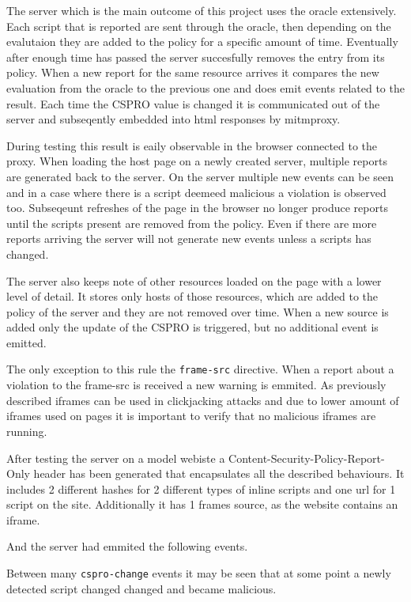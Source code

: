 \begin{description}
The server which is the main outcome of this project uses the oracle extensively.
Each script that is reported are sent through the oracle, then depending on the evalutaion they are added to the policy for a specific amount of time.
Eventually after enough time has passed the server succesfully removes the entry from its policy.
When a new report for the same resource arrives it compares the new evaluation from the oracle to the previous one and does emit events related to the result.
Each time the CSPRO value is changed it is communicated out of the server and subseqently embedded into html responses by mitmproxy.

During testing this result is eaily observable in the browser connected to the proxy.
When loading the host page on a newly created server, multiple reports are generated back to the server.
On the server multiple new events can be seen and in a case where there is a script deemeed malicious a violation is observed too.
Subseqeunt refreshes of the page in the browser no longer produce reports until the scripts present are removed from the policy.
Even if there are more reports arriving the server will not generate new events unless a scripts has changed.

The server also keeps note of other resources loaded on the page with a lower level of detail.
It stores only hosts of those resources, which are added to the policy of the server and they are not removed over time.
When a new source is added only the update of the CSPRO is triggered, but no additional event is emitted.

The only exception to this rule the \texttt{frame-src} directive. 
When a report about a violation to the frame-src is received a new warning is emmited.
As previously described iframes can be used in clickjacking attacks and due to lower amount of iframes used on pages it is important to verify that no malicious iframes are running.

After testing the server on a model webiste a Content-Security-Policy-Report-Only header has been generated that encapsulates all the described behaviours.
It includes 2 different hashes for 2 different types of inline scripts and one url for 1 script on the site.
Additionally it has 1 frames source, as the website contains an iframe.



And the server had emmited the following events.

Between many \texttt{cspro-change} events it may be seen that at some point a newly detected script changed changed and became malicious.


\end{description}
